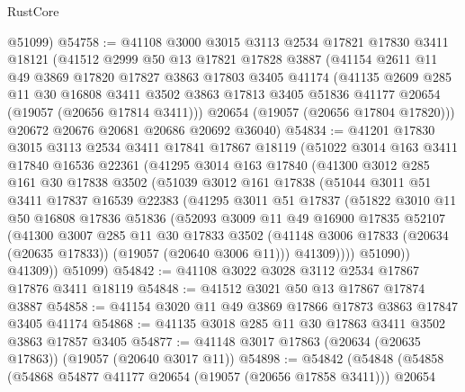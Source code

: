 \begin{lexlean}{RustCore}
\begin{coremodule}
      @51099)
@54758 := @41108
    @3000
    @3015
    @3113
    @2534
    @17821
    @17830
    @3411
    @18121
    (@41512
      @2999
      @50
      @13
      @17821
      @17828
      @3887
      (@41154
        @2611
        @11
        @49
        @3869
        @17820
        @17827
        @3863
        @17803
        @3405
        @41174
        (@41135
          @2609
          @285
          @11
          @30
          @16808
          @3411
          @3502
          @3863
          @17813
          @3405
          @51836
          @41177
          @20654
          (@19057 (@20656 @17814 @3411)))
        @20654
        (@19057 (@20656 @17804 @17820)))
      @20672
      @20676
      @20681
      @20686
      @20692
      @36040)
@54834 := @41201
    @17830
    @3015
    @3113
    @2534
    @3411
    @17841
    @17867
    @18119
    (@51022
      @3014
      @163
      @3411
      @17840
      @16536
      @22361
      (@41295
        @3014
        @163
        @17840
        (@41300
          @3012
          @285
          @161
          @30
          @17838
          @3502
          (@51039
            @3012
            @161
            @17838
            (@51044
              @3011
              @51
              @3411
              @17837
              @16539
              @22383
              (@41295
                @3011
                @51
                @17837
                (@51822
                  @3010
                  @11
                  @50
                  @16808
                  @17836
                  @51836
                  (@52093
                    @3009
                    @11
                    @49
                    @16900
                    @17835
                    @52107
                    (@41300
                      @3007
                      @285
                      @11
                      @30
                      @17833
                      @3502
                      (@41148 @3006 @17833 (@20634 (@20635 @17833)) (@19057 (@20640 @3006 @11)))
                      @41309))))
              @51090))
          @41309))
      @51099)
@54842 := @41108 @3022 @3028 @3112 @2534 @17867 @17876 @3411 @18119
@54848 := @41512 @3021 @50 @13 @17867 @17874 @3887
@54858 := @41154 @3020 @11 @49 @3869 @17866 @17873 @3863 @17847 @3405 @41174
@54868 := @41135 @3018 @285 @11 @30 @17863 @3411 @3502 @3863 @17857 @3405
@54877 := @41148 @3017 @17863 (@20634 (@20635 @17863)) (@19057 (@20640 @3017 @11))
@54898 := @54842
    (@54848
      (@54858
        (@54868 @54877 @41177 @20654 (@19057 (@20656 @17858 @3411)))
        @20654

\end{coremodule}
\end{lexlean}
